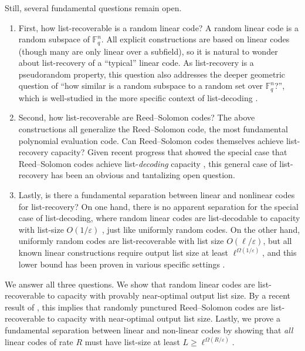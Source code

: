 \documentclass{article}
\begin{document}
Still, several fundamental questions remain open. 
\begin{enumerate}
    \item  First, how list-recoverable is a random linear code? A random linear code is a random subspace of $\mathbb{F}_q^n$. All explicit constructions are based on linear codes (though many are only linear over a subfield), so it is natural to wonder about list-recovery of a ``typical'' linear code. As list-recovery is a pseudorandom property, this question also addresses the deeper geometric question of ``how similar is a random subspace to a random set over $\mathbb{F}_q^n$?'', which is well-studied in the more specific context of list-decoding \cite{zyablov1981list, elias1991errorcorrecting,guruswami2011listdecodability, CGV13, wootters2013list, rudra2014every,RW15, rudra2018averageradius,li2020improved,guruswami2021bounds,AGL24}.
\item Second, how list-recoverable are Reed--Solomon codes? The above constructions all generalize the Reed--Solomon code, the most fundamental polynomial evaluation code. Can Reed--Solomon codes themselves achieve list-recovery capacity? Given recent progress that showed the special case that Reed--Solomon codes achieve list-\emph{decoding} capacity \cite{brakensiek2023generic, guo2023randomly, AGL24}, this general case of list-recovery has been an obvious and tantalizing open question.
\item Lastly, is there a fundamental separation between linear and nonlinear codes for list-recovery? On one hand, there is no apparent separation for the special case of list-decoding, where random linear codes are list-decodable to capacity with list-size $O(1/\varepsilon)$ \cite{guruswami2011listdecodability,wootters2013list,li2020improved,guruswami2021bounds}, just like uniformly random codes. On the other hand, uniformly random codes are list-recoverable with list size $O(\ell/\varepsilon)$, but all known linear constructions require output list size at least $\ell^{\Omega(1/\varepsilon)}$, and this lower bound has been proven in various specific settings \cite{guruswami2021bounds,levi2024random, chen2024explicit}.
\end{enumerate}

We answer all three questions.
We show that random linear codes are list-recoverable to capacity with provably near-optimal output list size.
By a recent result of \cite{levi2024random}, this implies that randomly punctured Reed--Solomon codes are list-recoverable to capacity with near-optimal output list size.
Lastly, we prove a fundamental separation between linear and non-linear codes by showing that \emph{all} linear codes of rate $R$ must have list-size at least $L\ge\ell^{\Omega(R/\varepsilon)}$.
\end{document}
